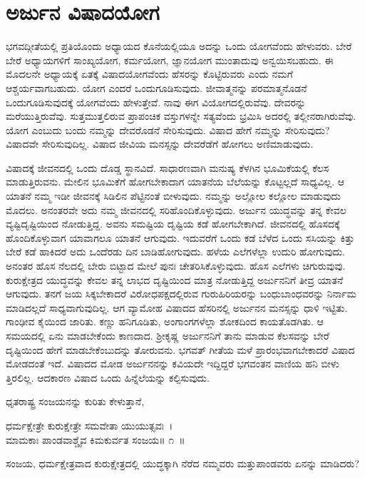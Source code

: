 
\chapter{ಅರ್ಜುನ ವಿಷಾದಯೋಗ}

ಭಗವದ್ಗೀತೆಯಲ್ಲಿ ಪ್ರತಿಯೊಂದು ಅಧ್ಯಾಯದ ಕೊನೆಯಲ್ಲಿಯೂ ಅದನ್ನು ಒಂದು ಯೋಗವೆಂದು ಹೇಳುವರು. ಬೇರೆ ಬೇರೆ ಅಧ್ಯಾಯಗಳಿಗೆ ಸಾಂಖ್ಯಯೋಗ, ಕರ್ಮಯೋಗ, ಜ್ಞಾನ\-ಯೋಗ ಮುಂತಾದುವು ಅನ್ವಯಿಸಬಹುದು. ಈ ಮೊದಲನೇ ಅಧ್ಯಾಯಕ್ಕೆ ಏತಕ್ಕೆ ವಿಷಾದಯೋಗವೆಂದು ಹೆಸರನ್ನು ಕೊಟ್ಟಿರುವರು ಎಂದು ನಮಗೆ ಆಶ್ಚರ್ಯವಾಗಬಹುದು. ಯೋಗ ಎಂದರೆ ಒಂದುಗೂಡಿಸುವುದು. ಜೀವಾತ್ಮನನ್ನು ಪರಮಾತ್ಮನೊಡನೆ ಒಂದುಗೂಡಿಸುವುದಕ್ಕೆ ಯೋಗವೆಂದು ಹೇಳುತ್ತೇವೆ. ನಾವು ಈಗ ವಿಯೋಗದಲ್ಲಿರುವೆವು. ದೇವರನ್ನು ಮರೆಯುತ್ತಿರುವೆವು. ಸುತ್ತಮುತ್ತಲಿರುವ ಪ್ರಾಪಂಚಿಕ ವಸ್ತುಗಳನ್ನೇ ಸತ್ಯವೆಂದು ಭ್ರಮಿಸಿ ಅದರಲ್ಲಿ ತಲ್ಲೀನರಾಗಿರುವೆವು. ಯೋಗ ಎಂಬುದು ಬಂದು ನಮ್ಮನ್ನು ದೇವರೊಡನೆ ಸೇರಿಸುವುದು. ವಿಷಾದ ಹೇಗೆ ನಮ್ಮನ್ನು ಸೇರಿಸುವುದು? ವಿಷಾದವೇ ಸೇರಿಸುವುದಿಲ್ಲ. ವಿಷಾದ ಜೀವಿಯ ಮನಸ್ಸನ್ನು ದೇವರೆಡೆಗೆ ಹೋಗಲು ಅಣಿಮಾಡುವುದು.

ವಿಷಾದಕ್ಕೆ ಜೀವನದಲ್ಲಿ ಒಂದು ದೊಡ್ಡ ಸ್ಥಾನವಿದೆ. ಸಾಧಾರಣವಾಗಿ ಮನುಷ್ಯ ಕೆಳಗಿನ ಭೂಮಿಕೆಯಲ್ಲಿ ಕೆಲಸ ಮಾಡುತ್ತಿರುವನು. ಮೇಲಿನ ಭೂಮಿಕೆಗೆ ಹೋಗಬೇಕಾದಾಗ ಯಾತನೆಯ ಬೆಲೆಯನ್ನು ಕೊಟ್ಟಲ್ಲದೆ ಸಾಧ್ಯವಿಲ್ಲ. ಆ ಯಾತನೆ ನಮ್ಮ ಇಡೀ ಜೀವನಕ್ಕೆ ಸಿಡಿಲಿನ ಪೆಟ್ಟಿನಂತೆ ಬೀಳುವುದು. ನಮ್ಮನ್ನು ಅಲ್ಲೋಲ ಕಲ್ಲೋಲ ಮಾಡುವುದು ಮೊದಲು. ಅನಂತರವೇ ಅದು ನಮ್ಮ ಜೀವನದಲ್ಲಿ ಸರಿಹೊಂದಿಕೊಳ್ಳುವುದು. ಅರ್ಜುನ ಯುದ್ಧವನ್ನು ತನ್ನ ಕೇವಲ ವ್ಯಷ್ಟಿದೃಷ್ಟಿಯಿಂದ ನೋಡುತ್ತಿದ್ದ. ಅವನು ಸಮಷ್ಟಿಯ ದೃಷ್ಟಿಯ ಕಡೆ ಹೋಗಬೇಕಾಗಿದೆ. ಜೀವನದಲ್ಲಿ ಹೊಸದಕ್ಕೆ ಹೊಂದಿಕೊಳ್ಳುವಾಗ ಯಾವಾಗಲೂ ಯಾತನೆ ಆಗುವುದು. ಇದುವರೆಗೆ ಒಂದು ಕಡೆ ಬೆಳೆದ ಒಂದು ಸಸಿಯನ್ನು ಕಿತ್ತು ಬೇರೆ ಕಡೆ ಹಾಕಿದರೆ ಅದು ಒಂದೆರಡು ದಿನ ಬಾಡಿಹೋಗುವುದು. ಹಳೆಯ ಎಲೆಗಳೆಲ್ಲಾ ಉದುರಿ ಹೋಗುವುದು. ಅನಂತರ ಹೊಸ ನೆಲದಲ್ಲಿ ಬೇರು ಬಿಟ್ಟಾದ ಮೇಲೆ ಪುನಃ ಚೇತರಿಸಿಕೊಳ್ಳುವುದು. ಹೊಸ ಎಲೆಗಳು ಚಿಗುರುವುವು. ಕುರುಕ್ಷೇತ್ರದ ಯುದ್ಧವನ್ನು ಕೇವಲ ತನ್ನ ಲಾಭದ ದೃಷ್ಟಿಯಿಂದ ಮಾತ್ರ ನೋಡುತ್ತಿದ್ದ ಅರ್ಜುನನಿಗೆ ತೀವ್ರ ಯಾತನೆ ಆಗುವುದು. ತನಗೆ ಜಯ ಸಿಕ್ಕಬೇಕಾದರೆ ವಿರೋಧಪಕ್ಷದಲ್ಲಿರುವ ಗುರುಹಿರಿಯರನ್ನು ಬಂಧುಬಾಂಧವರನ್ನು ನಿರ್ನಾಮ ಮಾಡಿದಲ್ಲದೆ ಸಾಧ್ಯವಾಗುವುದಿಲ್ಲ. ಆಗ ವ್ಯಾಮೋಹ ವಿಷಾದದ ಹೆಸರಿನಲ್ಲಿ ಅರ್ಜುನನ ಮನಸ್ಸನ್ನು ಧಾಳಿ ಇಟ್ಟಿತು. ಗಾಂಢೀವ ಕೈಯಿಂದ ಜಾರಿತು. ಕಣ್ಣು ಹನಿಗೂಡಿತು, ಅಂಗಾಂಗಗಳೆಲ್ಲಾ ಶೋಕದಿಂದ ಕಾಯತೊಡಗಿತು. ಆ ಸಮಯದಲ್ಲಿ ಏನು ಮಾಡಬೇಕೆಂದು ಕಾಣದಾದ. ಶ‍್ರೀಕೃಷ್ಣ ಅರ್ಜುನನಿಗೆ ತಾನು ಮಾಡುವ ಕೆಲಸವನ್ನು ಬೇರೆ ದೃಷ್ಟಿಯಿಂದ ಹೇಗೆ ಮಾಡಬೇಕೆಂಬುದನ್ನು ತೋರುವನು. ಭಗವತ್ ಗೀತೆಯ ಮಳೆ ಪ್ರಾರಂಭ\-ವಾಗ\-ಬೇಕಾದರೆ ವಿಷಾದ ಮೋಡದಂತೆ ಇದೆ. ವಿಷಾದದ ಮೋಡ ಅರ್ಜುನನನ್ನು ಕವಿಯದೇ ಇದ್ದಿದ್ದರೆ ಭಗವಂತನ ವಾಣಿಯ ಹನಿ ಬೀಳು ತ್ತಿರಲಿಲ್ಲ. ಆದಕಾರಣ ವಿಷಾದ ಒಂದು ಹಿನ್ನೆಲೆಯನ್ನು ಕಲ್ಪಿಸುವುದು.

ಧೃತರಾಷ್ಟ್ರ ಸಂಜಯನನ್ನು ಕುರಿತು ಕೇಳುತ್ತಾನೆ,

\begin{shloka}
ಧರ್ಮಕ್ಷೇತ್ರೇ ಕುರುಕ್ಷೇತ್ರೇ ಸಮವೇತಾ ಯುಯುತ್ಸವಃ~।\\ಮಾಮಕಾಃ ಪಾಂಡವಾಶ್ಚೈವ ಕಿಮಕುರ್ವತ ಸಂಜಯ\hfill॥ ೧~॥
\end{shloka}

\begin{artha}
ಸಂಜಯ, ಧರ್ಮಕ್ಷೇತ್ರವಾದ ಕುರುಕ್ಷೇತ್ರದಲ್ಲಿ ಯುದ್ಧಕ್ಕಾಗಿ ನೆರೆದ ನಮ್ಮವರು ಮತ್ತು\break ಪಾಂಡವರು ಏನನ್ನು ಮಾಡಿದರು?
\end{artha}

